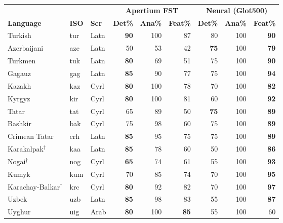 \begin{table}[t]
  \centering
  \footnotesize
  \setlength{\tabcolsep}{4.5pt}
  \begin{tabular}{@{}ll l  rrr  rrr@{}}
    \toprule
    & & & \multicolumn{3}{c}{\textbf{Apertium FST}} & \multicolumn{3}{c}{\textbf{Neural (Glot500)}} \\
    \cmidrule(lr){4-6} \cmidrule(lr){7-9}
    \textbf{Language} & \textbf{ISO} & \textbf{Scr} &
    \textbf{Det\%} & \textbf{Ana\%} & \textbf{Feat\%} &
    \textbf{Det\%} & \textbf{Ana\%} & \textbf{Feat\%} \\
    \midrule
    Turkish          & tur & Latn &  \textbf{90} & 100 &  87 &  80 & 100 & \textbf{90} \\
    Azerbaijani      & aze & Latn &   50 &  53 &  42 & \textbf{75} & 100 & \textbf{79} \\
    Turkmen          & tuk & Latn &  \textbf{80} &  69 &  51 &  75 & 100 & \textbf{90} \\
    Gagauz           & gag & Latn &  \textbf{85} &  90 &  77 &  75 & 100 & \textbf{94} \\
    \cmidrule(lr){1-9}
    Kazakh           & kaz & Cyrl &  \textbf{80} & 100 &  78 &  70 & 100 & \textbf{82} \\
    Kyrgyz           & kir & Cyrl &  \textbf{80} & 100 &  81 &  60 & 100 & \textbf{92} \\
    Tatar            & tat & Cyrl &   65 &  89 &  50 & \textbf{75} & 100 & \textbf{89} \\
    Bashkir          & bak & Cyrl &   75 &  98 &  60 &  75 & 100 & \textbf{89} \\
    Crimean Tatar    & crh & Latn &  \textbf{85} &  95 &  75 &  75 & 100 & \textbf{89} \\
    Karakalpak$^\dagger$       & kaa & Latn &  \textbf{85} &  78 &  60 &  50 & 100 & \textbf{86} \\
    Nogai$^\dagger$            & nog & Cyrl &  \textbf{65} &  74 &  61 &  55 & 100 & \textbf{93} \\
    Kumyk            & kum & Cyrl &   70 &  85 &  74 &  70 & 100 & \textbf{95} \\
    Karachay-Balkar$^\dagger$  & krc & Cyrl &  \textbf{80} &  92 &  82 &  70 & 100 & \textbf{97} \\
    \cmidrule(lr){1-9}
    Uzbek            & uzb & Latn &  \textbf{85} &  98 &  83 &  55 & 100 & \textbf{87} \\
    Uyghur           & uig & Arab &  \textbf{80} & 100 & \textbf{85} &  55 & 100 &  60 \\

\end{tabular}
\end{table}
